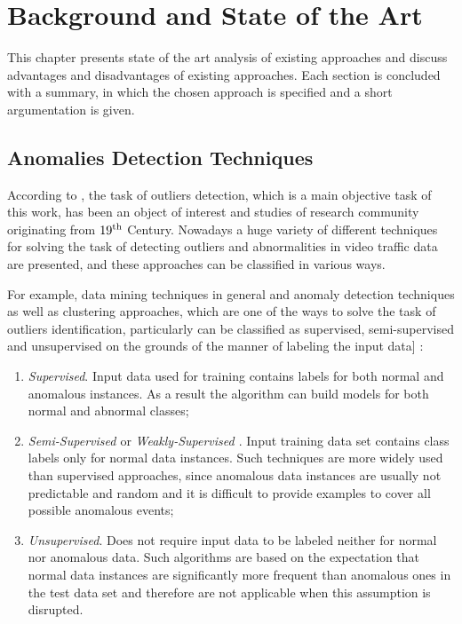 \chapter{Background and State of the Art}
\label{ch:Background and State of the Art}

This chapter presents state of the art analysis of existing approaches and discuss advantages and disadvantages of existing approaches. Each section is concluded with a summary, in which the chosen approach is specified and a short argumentation is given.

\section{Anomalies Detection Techniques}
According to \cite{article:15_survey_ad}, the task of outliers detection, which is a main objective task of this work, has been an object of interest and studies of research community originating from $19\textsuperscript{th}$ Century. Nowadays a huge variety of different techniques for solving the task of detecting outliers and abnormalities in video traffic data are presented, and these approaches can be classified in various ways.

For example, data mining techniques in general and anomaly detection techniques as well as clustering approaches, which are one of the ways to solve the task of outliers identification, particularly can be classified as supervised, semi-supervised and unsupervised on the grounds of the manner of labeling the input data] \cite{article:15_survey_ad}\cite{article:comp_analys_odt}:
\begin{enumerate}
	\item \textit{Supervised}. Input data used for training contains labels for both normal and anomalous instances. As a result the algorithm can build models for both normal and abnormal classes;
	\item \textit{Semi-Supervised \cite{article:15_survey_ad}} or \textit{Weakly-Supervised \cite{article:5_survey_tbsa}}. Input training data set contains class labels only for normal data instances. Such techniques are more widely used than supervised approaches, since anomalous data instances are usually not predictable and random and it is difficult to provide examples to cover all possible anomalous events;
	\item \textit{Unsupervised}. Does not require input data to be labeled neither for normal nor anomalous data. Such algorithms are based on the expectation that normal data instances are significantly more frequent than anomalous ones in the test data set and therefore are not applicable when this assumption is disrupted.
\end{enumerate}

